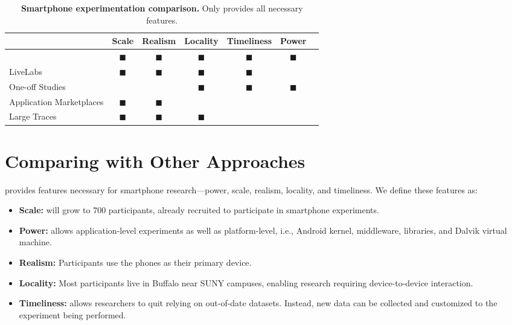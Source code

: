 \begin{table*}[t]
\begin{tabularx}{\textwidth}{Xcccccc}
& {\normalsize{\textbf{Scale}}} &
{\normalsize{\textbf{Realism}}} &
{\normalsize{\textbf{Locality}}} &
{\normalsize{\textbf{Timeliness}}} &
{\normalsize{\textbf{Power}}} \\
\toprule

{\large \PhoneLab{}}
& $\blacksquare$ & $\blacksquare$ & $\blacksquare$ & $\blacksquare$ & $\blacksquare$ \\
\toprule

LiveLabs &
$\blacksquare$ & $\blacksquare$ & $\blacksquare$ & $\blacksquare$ & & \\
\midrule

One-off Studies &
& & $\blacksquare$ & $\blacksquare$ & $\blacksquare$ \\
\midrule

Application Marketplaces &
$\blacksquare$ & $\blacksquare$ & & & \\
\midrule

Large Traces &
$\blacksquare$ & $\blacksquare$ & $\blacksquare$ & & \\

\end{tabularx}
\caption{\textbf{Smartphone experimentation comparison.} Only \PhoneLab{}
provides all necessary features.}
\label{tab:comparison}
\end{table*}

\section{Comparing \PhoneLab{} with Other Approaches}
\label{sec-comparison}

\PhoneLab{} provides features necessary for smartphone research---power,
scale, realism, locality, and timeliness. We define these features as:

\begin{itemize}[nosep]
\item {\bf Scale:} \PhoneLab{} will grow to 700 participants, already
recruited to participate in smartphone experiments.
\item {\bf Power:} \PhoneLab{} allows application-level experiments as well
as platform-level, i.e., Android kernel, middleware, libraries, and Dalvik
virtual machine.
\item {\bf Realism:} Participants use the phones as their primary device.
\item {\bf Locality:} Most participants live in Buffalo near SUNY campuses,
enabling research requiring device-to-device interaction.
\item {\bf Timeliness:} \PhoneLab{} allows researchers to quit relying on
out-of-date datasets. Instead, new data can be collected and customized to
the experiment being performed.
\end{itemize}

